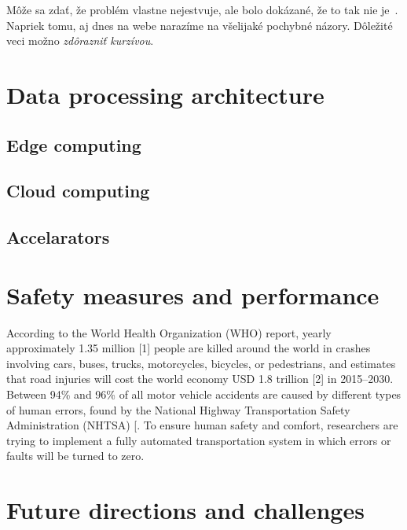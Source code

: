 \documentclass[10pt,oneside,english,a4paper]{article}
\begin{document}
Môže sa zdať, že problém vlastne nejestvuje\cite{Coplien:MPD}, ale bolo dokázané, že to tak nie je~\cite{Czarnecki:Staged, Czarnecki:Progress}. Napriek tomu, aj dnes na webe narazíme na všelijaké pochybné názory\cite{PLP-Framework}. Dôležité veci možno \emph{zdôrazniť kurzívou}.



\section{Data processing architecture} \label{architecture}

\subsection{Edge computing}

\subsection{Cloud computing}

\subsection{Accelarators}

\section{Safety measures and performance} \label{safety}


According to the World Health Organization (WHO) report, yearly approximately 1.35 million [1] people are killed around the world in crashes involving cars, buses, trucks, motorcycles, bicycles, or pedestrians, and estimates that road injuries will cost the world economy USD 1.8 trillion [2] in 2015–2030. Between 94\% and 96\% of all motor vehicle accidents are caused by different types of human errors, found by the National Highway Transportation Safety Administration (NHTSA) [. To ensure human safety and comfort, researchers are trying to implement a fully automated transportation system in which errors or faults will be turned to zero.


\section{Future directions and challenges} \label{future}
\end{document}
